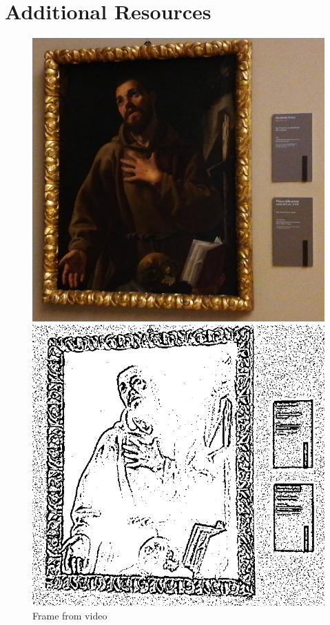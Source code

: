 \section*{Additional Resources}
\begin{figure}[hb!]
    \centering
        \includegraphics[width=\linewidth]{pictures/painting_detection/Frame.png}
        \caption*{Frame from video}\label{fig:Frame}
      \endminipage\hfill
        \includegraphics[width=\linewidth]{pictures/painting_detection/2-adaptive_threshold.PNG}

\end{figure}

